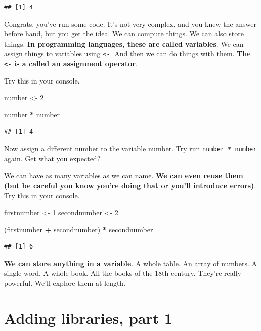 \documentclass[]{book}
\newenvironment{Shaded}{\begin{snugshade}}{\end{snugshade}}
\newcommand{\DecValTok}[1]{\textcolor[rgb]{0.00,0.00,0.81}{#1}}
\newcommand{\NormalTok}[1]{#1}
\newcommand{\OperatorTok}[1]{\textcolor[rgb]{0.81,0.36,0.00}{\textbf{#1}}}
\newcommand{\StringTok}[1]{\textcolor[rgb]{0.31,0.60,0.02}{#1}}
\begin{document}
\begin{verbatim}
## [1] 4
\end{verbatim}

Congrats, you've run some code. It's not very complex, and you knew the answer before hand, but you get the idea. We can compute things. We can also store things. \textbf{In programming languages, these are called variables}. We can assign things to variables using \texttt{\textless{}-}. And then we can do things with them. \textbf{The \texttt{\textless{}-} is a called an assignment operator}.

Try this in your console.

\begin{Shaded}
\begin{Highlighting}[]
\NormalTok{number <-}\StringTok{ }\DecValTok{2}

\NormalTok{number }\OperatorTok{*}\StringTok{ }\NormalTok{number}
\end{Highlighting}
\end{Shaded}

\begin{verbatim}
## [1] 4
\end{verbatim}

Now assign a different number to the variable number. Try run \texttt{number\ *\ number} again. Get what you expected?

We can have as many variables as we can name. \textbf{We can even reuse them (but be careful you know you're doing that or you'll introduce errors)}. Try this in your console.

\begin{Shaded}
\begin{Highlighting}[]
\NormalTok{firstnumber <-}\StringTok{ }\DecValTok{1}
\NormalTok{secondnumber <-}\StringTok{ }\DecValTok{2} 

\NormalTok{(firstnumber }\OperatorTok{+}\StringTok{ }\NormalTok{secondnumber) }\OperatorTok{*}\StringTok{ }\NormalTok{secondnumber}
\end{Highlighting}
\end{Shaded}

\begin{verbatim}
## [1] 6
\end{verbatim}

\textbf{We can store anything in a variable}. A whole table. An array of numbers. A single word. A whole book. All the books of the 18th century. They're really powerful. We'll explore them at length.

\hypertarget{adding-libraries-part-1}{%
\section{Adding libraries, part 1}\label{adding-libraries-part-1}}
\end{document}
